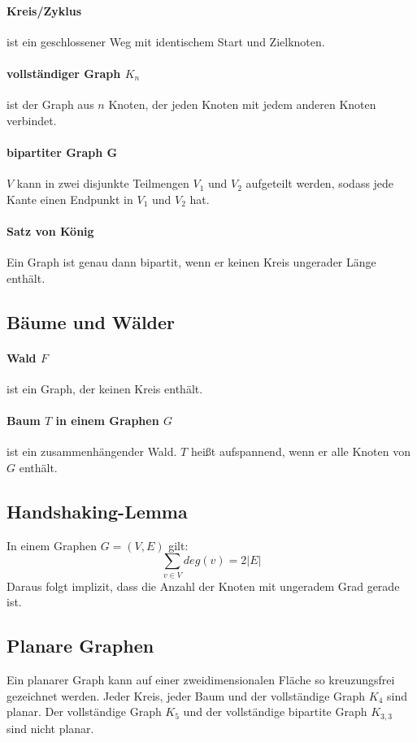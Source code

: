 \documentclass[10pt,a4paper,landscape]{article}
\begin{document}
\begin{multicols*}{2}
            \paragraph*{ Kreis/Zyklus } ist ein geschlossener Weg mit identischem Start und Zielknoten.

            \paragraph*{ vollständiger Graph $K_{n}$ } ist der Graph aus $n$ Knoten, der jeden Knoten mit jedem anderen Knoten verbindet.
            \paragraph*{ bipartiter Graph G } $V$ kann in zwei disjunkte Teilmengen $V_1$ und $V_2$ aufgeteilt werden, sodass jede Kante einen 
            Endpunkt in $V_1$ und $V_2$ hat.
            \paragraph*{ Satz von König }
            Ein Graph ist genau dann bipartit, wenn er keinen Kreis ungerader Länge enthält.

            \subsection{ Bäume und Wälder }
            \paragraph*{ Wald $F$ } ist ein Graph, der keinen Kreis enthält.
            \paragraph*{ Baum $T$ in einem Graphen $G$ } ist ein zusammenhängender Wald. $T$ heißt aufspannend, wenn er alle Knoten von $G$ enthält. 

            \subsection{ Handshaking-Lemma }
            In einem Graphen $G = (V, E)$ gilt:
            \[ \sum_{v\in V} deg(v) = 2|E| \]
            Daraus folgt implizit, dass die Anzahl der Knoten mit ungeradem Grad gerade ist.

            \subsection{ Planare Graphen }
            Ein planarer Graph kann auf einer zweidimensionalen Fläche so kreuzungsfrei gezeichnet werden. Jeder Kreis, 
            jeder Baum und der vollständige Graph $K_4$ sind planar. Der vollständige Graph $K_5$ und der vollständige 
            bipartite Graph $K_{3,3}$ sind nicht planar.

\end{multicols*}
\end{document}
